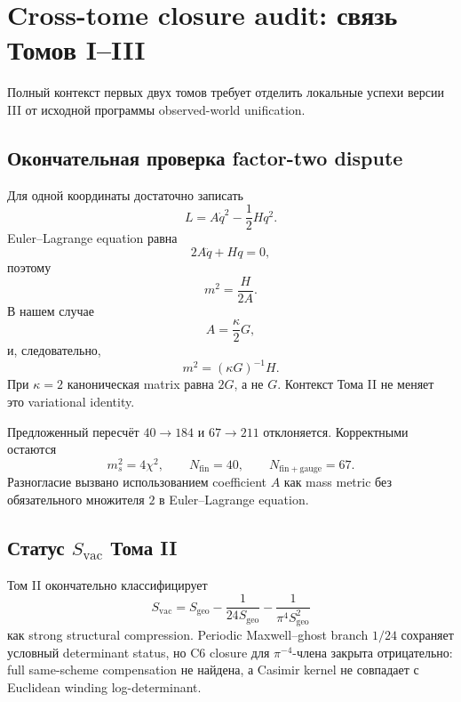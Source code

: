 \chapter{Cross-tome closure audit: связь Томов I--III}

Полный контекст первых двух томов требует отделить локальные успехи
версии III от исходной программы observed-world unification.

\section{Окончательная проверка factor-two dispute}

Для одной координаты достаточно записать
\begin{equation}
 L=A\dot q^2-\frac12Hq^2.
\end{equation}
Euler--Lagrange equation равна
\begin{equation}
 2A\ddot q+Hq=0,
\end{equation}
поэтому
\begin{equation}
 m^2=\frac{H}{2A}.
\end{equation}
В нашем случае
\begin{equation}
 A=\frac{\kappa}{2}G,
\end{equation}
и, следовательно,
\begin{equation}
 m^2=(\kappa G)^{-1}H.
\end{equation}
При \(\kappa=2\) каноническая matrix равна \(2G\), а не \(G\).
Контекст Тома II не меняет это variational identity.

\begin{theorem}
Предложенный пересчёт \(40\to184\) и \(67\to211\) отклоняется.
Корректными остаются
\begin{equation}
 m_s^2=4\chi^2,
 \qquad
 N_{\mathrm{fin}}=40,
 \qquad
 N_{\mathrm{fin+gauge}}=67.
\end{equation}
Разногласие вызвано использованием coefficient \(A\) как mass metric без
обязательного множителя \(2\) в Euler--Lagrange equation.
\end{theorem}

\section{Статус \(S_{\mathrm{vac}}\) Тома II}

Том II окончательно классифицирует
\begin{equation}
 S_{\mathrm{vac}}
 =
 S_{\mathrm{geo}}
 -\frac1{24S_{\mathrm{geo}}}
 -\frac1{\pi^4S_{\mathrm{geo}}^2}
\end{equation}
как strong structural compression. Periodic Maxwell--ghost branch
\(1/24\) сохраняет условный determinant status, но C6 closure для
\(\pi^{-4}\)-члена закрыта отрицательно: full same-scheme compensation
не найдена, а Casimir kernel не совпадает с Euclidean winding
log-determinant.

